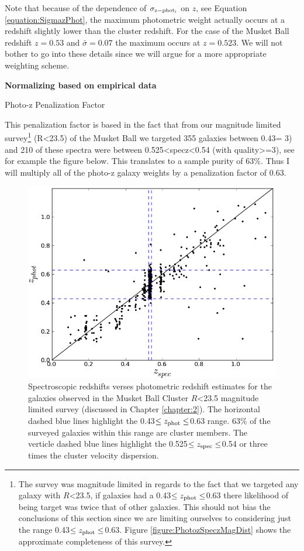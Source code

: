 Note that because of the dependence of $\sigma_{\rm z-phot_{i}}$ on $z$, see Equation \ref{equation:SigmazPhot}, the maximum photometric weight actually occurs at a redshift slightly lower than the cluster redshift. For the case of the Musket Ball redshift $z=0.53$ and $\bar{\sigma}=0.07$ the maximum occurs at $z=0.523$. We will not bother to go into these details since we will argue for a more appropriate weighting scheme.

\textbf{Normalizing based on empirical data}

Photo-z Penalization Factor

This penalization factor is based in the fact that from our magnitude limited survey\footnote{The survey was magnitude limited in regards to the fact that we targeted any galaxy with $R$<23.5, if galaxies had a 0.43$\leq z_{\rm phot} \leq$0.63 there likelihood of being target was twice that of other galaxies. This should not bias the conclusions of this section since we are limiting ourselves to considering just the range 0.43$\leq z_{\rm phot} \leq$0.63. Figure \ref{figure:PhotozSpeczMagDist} shows the approximate completeness of this survey.} (R<23.5) of the Musket Ball we targeted 355 galaxies between 0.43= 3) and 210 of these spectra were between 0.525<specz<0.54 (with quality>=3), see for example the figure below. This translates to a sample purity of 63\%.  Thus I will multiply all of the photo-z galaxy weights by a penalization factor of 0.63.


\begin{figure}
\centering
\includegraphics[width=5in]{Chapter4/photVSspec.png}
\caption[Spectroscopic verses photometric redshift for the Musket Ball Cluster.]{
Spectroscopic redshifts verses photometric redshift estimates for the galaxies observed in the Musket Ball Cluster $R$<23.5 magnitude limited survey (discussed in Chapter \ref{chapter:2}).
The horizontal dashed blue lines highlight the 0.43$\leq z_{\rm phot} \leq$0.63 range.
63\% of the surveyed galaxies within this range are cluster members.
The verticle dashed blue lines highlight the 0.525$\leq z_{\rm spec} \leq$0.54 or three times the cluster velocity dispersion.
}
\label{figure:photzVSspecz}
\end{figure}

